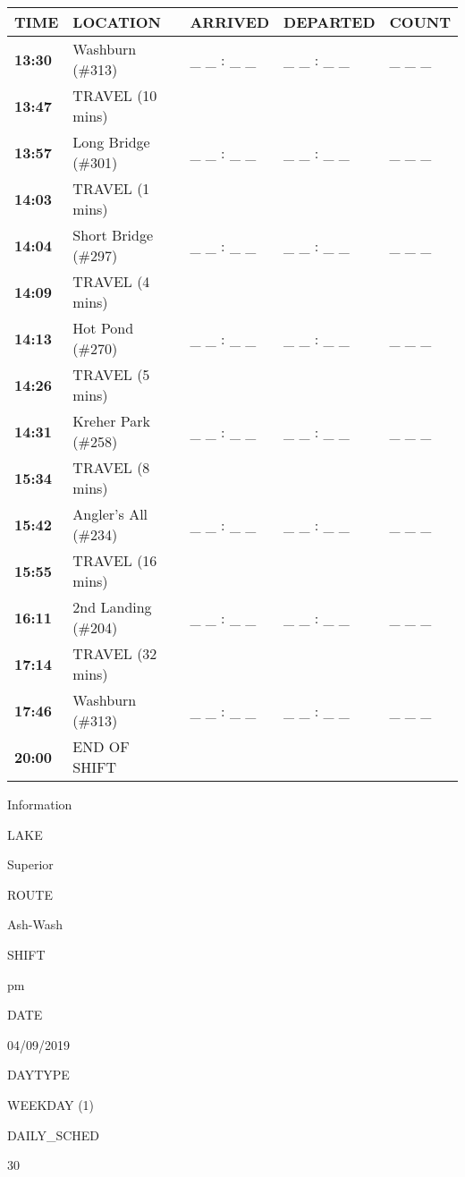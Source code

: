 \documentclass[]{article}
\begin{document}
\begin{tabular}{>{\bfseries}lllll}
\toprule
\textbf{TIME} & \textbf{LOCATION} & \textbf{ARRIVED} & \textbf{DEPARTED} & \textbf{COUNT}\\
\midrule
13:30 & Washburn (\#313) & \_ \_ : \_ \_ & \_ \_ : \_ \_ & \_ \_ \_\\
13:47 & TRAVEL (10 mins) &  &  & \\
13:57 & Long Bridge (\#301) & \_ \_ : \_ \_ & \_ \_ : \_ \_ & \_ \_ \_\\
14:03 & TRAVEL (1 mins) &  &  & \\
14:04 & Short Bridge (\#297) & \_ \_ : \_ \_ & \_ \_ : \_ \_ & \_ \_ \_\\
14:09 & TRAVEL (4 mins) &  &  & \\
14:13 & Hot Pond (\#270) & \_ \_ : \_ \_ & \_ \_ : \_ \_ & \_ \_ \_\\
14:26 & TRAVEL (5 mins) &  &  & \\
14:31 & Kreher Park (\#258) & \_ \_ : \_ \_ & \_ \_ : \_ \_ & \_ \_ \_\\
15:34 & TRAVEL (8 mins) &  &  & \\
15:42 & Angler's All (\#234) & \_ \_ : \_ \_ & \_ \_ : \_ \_ & \_ \_ \_\\
15:55 & TRAVEL (16 mins) &  &  & \\
16:11 & 2nd Landing (\#204) & \_ \_ : \_ \_ & \_ \_ : \_ \_ & \_ \_ \_\\
17:14 & TRAVEL (32 mins) &  &  & \\
17:46 & Washburn (\#313) & \_ \_ : \_ \_ & \_ \_ : \_ \_ & \_ \_ \_\\
20:00 & END OF SHIFT &  &  & \\
\bottomrule
\end{tabular}\newpage

Information

LAKE

Superior

ROUTE

Ash-Wash

SHIFT

pm

DATE

04/09/2019

DAYTYPE

WEEKDAY (1)

DAILY\_SCHED

30

\vspace{24pt}
\end{document}
